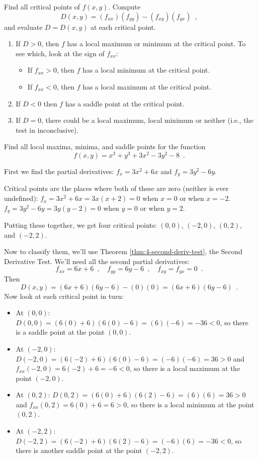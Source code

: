 \begin{theorem}
\label{thm:4-second-deriv-test}
Find all critical points of $f(x,y)$.
Compute
$$D(x,y)=(f_{xx})(f_{yy})-(f_{xy})(f_{yx}) \enspace ,$$
and evaluate $D = D(x,y)$ at each critical point.
  \begin{enumerate}[label = (\alph*)]
    \item If $D>0$, then $f$ has a local maximum or minimum at the critical point. To see which, look at the sign of $f_{xx}$:
    \begin{itemize}
      \item If $f_{xx} > 0$, then $f$ has a local minimum at the critical point.
      \item If $f_{xx} < 0$, then $f$ has a local maximum at the critical point.
    \end{itemize}
    \item If $D<0$ then $f$ has a saddle point at the critical point.
    \item If $D=0$, there could be a local maximum, local minimum or neither (i.e., the test in inconclusive).
  \end{enumerate}
\end{theorem}
\begin{example}
Find all local maxima, minima, and saddle points for the function
$$f(x,y)=x^3+y^3+3x^2-3y^2-8 \enspace.$$

\begin{solution}
  First we find the partial derivatives: $f_x=3x^2+6x$ and $f_y=3y^2-6y$.

Critical points are the places where both of these are zero (neither is ever undefined): $f_x=3x^2+6x=3x(x+2)=0$ when $x=0$ or when $x=-2$. $f_y=3y^2-6y=3y(y-2)=0$ when $y=0$ or when $y=2$.

Putting these together, we get four critical points: $(0, 0)$, $(-2, 0)$, $(0, 2)$, and $(-2, 2)$.

Now to classify them, we'll use Theorem \ref{thm:4-second-deriv-test}, the Second Derivative Test. We'll need all the second partial derivatives:
$$f_{xx}=6x+6 \enspace, \quad f_{yy}=6y-6 \enspace, \quad f_{xy}=f_{yx}=0 \enspace. $$
Then
$$D(x,y)=(6x+6)(6y-6)-(0)(0)=(6x+6)(6y-6) \enspace .$$
Now look at each critical point in turn:
  \begin{itemize}
    \item At $(0, 0)$: $D(0,0)=(6(0)+6)(6(0)-6)=(6)(-6)=-36<0$, so there is a saddle point at the point $(0, 0)$.
    \item At $(-2, 0)$: $D(-2,0)=(6(-2)+6)(6(0)-6)=(-6)(-6)=36>0$ and $f_{xx}(-2,0)=6(-2)+6=-6<0$, so there is a local maximum at the point $(-2, 0)$.
    \item At $(0, 2)$: $D(0,2)=(6(0)+6)(6(2)-6)=(6)(6)=36>0$ and $f_{xx}(0,2)=6(0)+6=6>0$, so there is a local minimum at the point $(0, 2)$.
    \item At $(-2, 2)$: $D(-2,2)=(6(-2)+6)(6(2)-6)=(-6)(6)=-36<0$, so there is another saddle point at the point $(-2, 2)$.
  \end{itemize}
\end{solution}\end{example}

